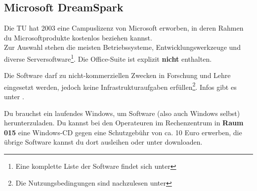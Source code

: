 
\subsection{Microsoft DreamSpark}
	\label{msdnaa}
	Die TU hat  2003 eine Campuslizenz von Microsoft erworben, in deren Rahmen du Microsoftprodukte kostenlos beziehen kannst.\\ 
	Zur Auswahl stehen die meisten Betriebssysteme, Entwicklungswerkzeuge und diverse Serversoftware\footnote{\sloppy Eine komplette Liste der Software findet sich unter }. Die Office-Suite ist explizit \textbf{nicht} enthalten.

	Die Software darf zu nicht-kommerziellen Zwecken in Forschung und Lehre eingesetzt werden, jedoch keine Infrastrukturaufgaben erfüllen\footnote{Die Nutzungsbedingungen sind nachzulesen unter }. Infos gibt es unter .

	Du brauchst ein laufendes Windows, um Software (also auch
	Windows selbst) herunterzuladen. Du kannst  bei den Operateuren
	im Rechenzentrum in \textbf{Raum 015} eine Windows-CD gegen eine Schutzgebühr von ca. 10 Euro erwerben, die übrige Software kannst du dort ausleihen oder unter  downloaden.
